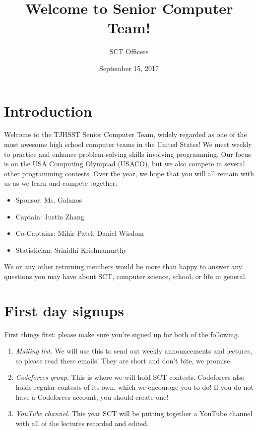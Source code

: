 \documentclass{article}
\title{Welcome to Senior Computer Team!}
\author{SCT Officers}
\date{September 15, 2017}
\begin{document}
\maketitle

\section{Introduction}

Welcome to the TJHSST Senior Computer Team, widely regarded as one of the most awesome high school computer teams in the United States! We meet weekly to practice and enhance problem-solving skills involving programming. Our focus is on the USA Computing Olympiad (USACO), but we also compete in several other programming contests. Over the year, we hope that you will all remain with us as we learn
and compete together.

\begin{itemize}
	\item Sponsor: Ms. Galanos
	\item Captain: Justin Zhang
	\item Co-Captains: Mihir Patel, Daniel Wisdom
	\item Statistician: Srinidhi Krishnamurthy
\end{itemize}

We or any other returning members would be more than happy to answer any questions you may have about SCT, computer science, school, or life in general.


\section{First day signups}

First things first: please make sure you're signed up for both of the following.

\begin{enumerate}
    \item \textit{Mailing list.} We will use this to send out weekly announcements and lectures, so please read these emails! They are short and don't bite, we promise.
    \item \textit{Codeforces group.} This is where we will hold SCT contests. Codeforces also holds regular contests of its own, which we encourage you to do! If you do not have a Codeforces account, you should create one!
    \item \textit{YouTube channel.} This year SCT will be putting together a YouTube channel with all of the lectures recorded and edited. 
\end{enumerate}
\end{document}
